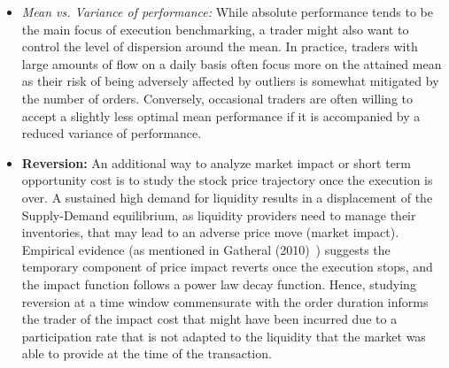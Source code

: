 \begin{itemize}
\item \emph{Mean vs. Variance of performance:} While absolute performance tends to be the main focus of execution benchmarking, a trader might also want to control the level of dispersion around the mean. In practice, traders with large amounts of flow on a daily basis often focus more on the attained mean as their risk of being adversely affected by outliers is somewhat mitigated by the number of orders. Conversely, occasional traders are often willing to accept a slightly less optimal mean performance if it is accompanied by a reduced variance of performance.

\item \textbf{Reversion:} An additional way to analyze market impact or short term opportunity cost is to study the stock price trajectory once the execution is over. A sustained high demand for liquidity results in a displacement of the Supply-Demand equilibrium, as liquidity providers need to manage their inventories, that may lead to an adverse price move (market impact). Empirical evidence (as mentioned in Gatheral (2010)~\cite{gatheral}) suggests the temporary component of price impact reverts once the execution stops, and the impact function follows a power law decay function. Hence, studying reversion at a time window commensurate with the order duration informs the trader of the impact cost that might have been incurred due to a participation rate that is not adapted to the liquidity that the market was able to provide at the time of the transaction.


\end{itemize}
